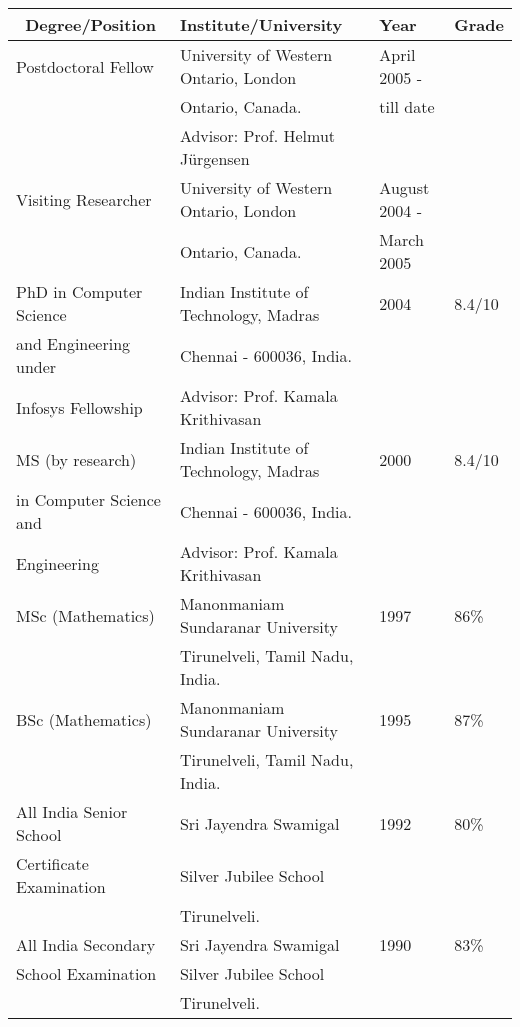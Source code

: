 \documentclass[11pt]{article}
\begin{document}
 \ \\\\
\begin{tabular}{|l|l|l|l|} \hline \
Degree/Position & Institute/University & Year & Grade \\ \hline
Postdoctoral Fellow & University of Western Ontario, London & April 2005 - & \\
& Ontario, Canada. & till date & \\
& Advisor: Prof. Helmut J\"{u}rgensen & & \\ \hline
Visiting Researcher & University of Western Ontario, London & August 2004 -  & \\
& Ontario, Canada. & March 2005 & \\ \hline
PhD in Computer Science & Indian Institute of Technology, Madras & 2004 & 8.4/10 \\
and Engineering under & Chennai - 600036, India. &  & \\
Infosys Fellowship & Advisor: Prof. Kamala Krithivasan & &\\ \hline
MS (by research)& Indian Institute of Technology, Madras
& 2000 & 8.4/10 \\
in Computer Science and & Chennai - 600036, India. & & \\
Engineering & Advisor: Prof. Kamala Krithivasan & & \\ \hline
MSc (Mathematics)& Manonmaniam Sundaranar University & 1997 & 86\% \\
& Tirunelveli, Tamil Nadu, India. & & \\ \hline
BSc (Mathematics)& Manonmaniam Sundaranar University & 1995 & 87\% \\
& Tirunelveli, Tamil Nadu, India. & & \\ \hline
All India Senior School & Sri Jayendra Swamigal &  1992 & 80\% \\
Certificate Examination & Silver Jubilee School & & \\
& Tirunelveli. & & \\ \hline
All India Secondary & Sri Jayendra Swamigal &  1990 & 83\% \\
School Examination & Silver Jubilee School & & \\
& Tirunelveli. & & \\ \hline
\end{tabular}

\vspace{0.5cm}
 
\end{document}
